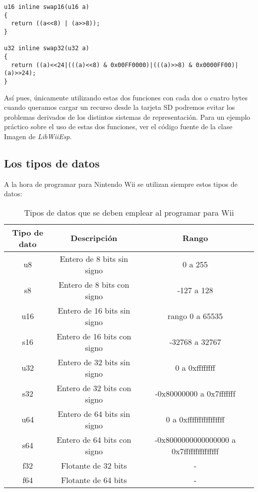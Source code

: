 \begin{lstlisting}[style=C++]
u16 inline swap16(u16 a)
{
  return ((a<<8) | (a>>8));
}

u32 inline swap32(u32 a)
{
  return ((a)<<24|(((a)<<8) & 0x00FF0000)|(((a)>>8) & 0x0000FF00)|(a)>>24);
}
\end{lstlisting}

Así pues, únicamente utilizando estas dos funciones con cada dos o cuatro bytes cuando queramos cargar un recurso desde la tarjeta SD podremos evitar los problemas derivados de los distintos sistemas de representación. Para un ejemplo práctico sobre el uso de estas dos funciones, ver el código fuente de la clase Imagen de \emph{LibWiiEsp}.

\subsection{Los tipos de datos}

A la hora de programar para Nintendo Wii se utilizan siempre estos tipos de datos:

\begin{table}[H]
  \label{tiposdatos}
  \begin{center}
  \begin{tabular}{| c | c | c |}
    \hline
    Tipo de dato & Descripción & Rango \\ \hline
    u8 & Entero de 8 bits sin signo & 0 a 255 \\ \hline
    s8 & Entero de 8 bits con signo & -127 a 128 \\ \hline
    u16 & Entero de 16 bits sin signo & rango 0 a 65535 \\ \hline
    s16 & Entero de 16 bits con signo & -32768 a 32767 \\ \hline
    u32 & Entero de 32 bits sin signo & 0 a 0xffffffff \\ \hline
    s32 & Entero de 32 bits con signo & -0x80000000 a 0x7fffffff \\ \hline
    u64 & Entero de 64 bits sin signo & 0 a 0xffffffffffffffff \\ \hline
    s64 & Entero de 64 bits con signo & -0x8000000000000000 a 0x7fffffffffffffff  \\ \hline
    f32 & Flotante de 32 bits & - \\ \hline
    f64 & Flotante de 64 bits & - \\ \hline
  \end{tabular}
  \end{center}
  \caption{Tipos de datos que se deben emplear al programar para Wii}
\end{table}


